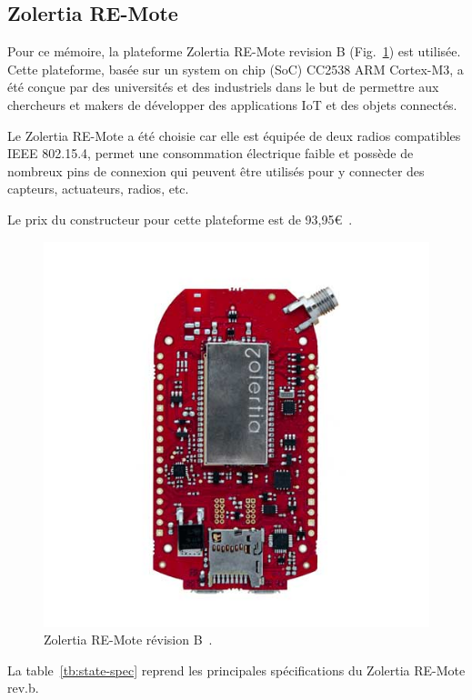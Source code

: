 \subsection*{Zolertia RE-Mote}
Pour ce mémoire, la plateforme Zolertia RE-Mote revision B (Fig.~\ref{fig:state-zolertia}) est utilisée.
Cette plateforme, basée sur un system on chip (SoC) CC2538 ARM Cortex-M3, a été conçue par des universités et des industriels dans le but de permettre aux chercheurs et makers de développer des applications IoT et des objets connectés.

Le Zolertia RE-Mote a été choisie car elle est équipée de deux radios compatibles IEEE 802.15.4,
permet une consommation électrique faible et possède de nombreux pins de connexion qui peuvent être utilisés pour y connecter des capteurs, actuateurs, radios, etc.

Le prix du constructeur pour cette plateforme est de 93,95€~\cite{zolertia-remote:shop}.

\begin{figure}[H]
    \centering
    \includegraphics[scale=0.3]{res/pictures/remote-zolertia.jpg}
    \caption{Zolertia RE-Mote révision B~\cite{zolertia-remote:shop}.}
    \label{fig:state-zolertia}
\end{figure}

La table~\ref{tb:state-spec} reprend les principales spécifications du Zolertia RE-Mote rev.b.

